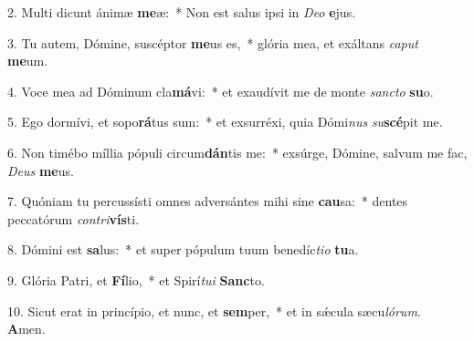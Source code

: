 2. Multi dicunt ánimæ \textbf{me}æ:~*  Non est salus ipsi in \textit{De}\textit{o} \textbf{e}jus.\

3. Tu autem, Dómine, suscéptor \textbf{me}us es,~*  glória mea, et exáltans \textit{ca}\textit{put} \textbf{me}um.\

4. Voce mea ad Dóminum cla\textbf{má}vi:~*  et exaudívit me de monte \textit{sanc}\textit{to} \textbf{su}o.\

5. Ego dormívi, et sopo\textbf{rá}tus sum:~*  et exsurréxi, quia Dómi\textit{nus} \textit{su}\textbf{scé}pit me.\

6. Non timébo míllia pópuli circum\textbf{dán}tis me:~*  exsúrge, Dómine, salvum me fac, \textit{De}\textit{us} \textbf{me}us.\

7. Quóniam tu percussísti omnes adversántes mihi sine \textbf{cau}sa:~*  dentes peccatórum \textit{con}\textit{tri}\textbf{vís}ti.\

8. Dómini est \textbf{sa}lus:~*  et super pópulum tuum benedíc\textit{ti}\textit{o} \textbf{tu}a.\

9. Glória Patri, et \textbf{Fí}lio,~*  et Spirí\textit{tu}\textit{i} \textbf{Sanc}to.\

10. Sicut erat in princípio, et nunc, et \textbf{sem}per,~*  et in sǽcula sæcu\textit{ló}\textit{rum}. \textbf{A}men.\

